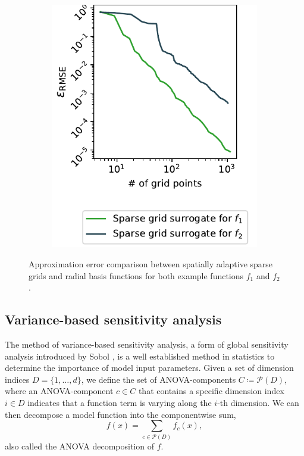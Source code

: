 \documentclass[
  a4paper,  %
  twoside,  %
  bibliography=totoc,
  headsepline,
  cleardoublepage=empty,
  parskip=half,
  draft=false
]{scrbook}
\begin{document}
\begin{mdframed}[style=style]
\begin{figure}[H]
\begin{subfigure}{.5\textwidth}
  \includegraphics[width=\linewidth]{graphics/grid_approx_f2}
  \label{fig:grid_approx_f2}
\vspace{2.5mm}
\end{subfigure}
  \delimit
\caption{
Approximation error comparison between spatially adaptive sparse grids and radial basis functions for both example functions $f_1$ and $f_2$.}
  \label{fig:dim_reduction_errors}
\end{figure}
\end{mdframed}

\subsection{Variance-based sensitivity analysis}

The method of variance-based sensitivity analysis, a form of global sensitivity analysis introduced by Sobol \cite{S01}, is a well established method in statistics to determine the importance of model input parameters.
Given a set of dimension indices $D=\{1,\dots,d\}$, we define the set of ANOVA-components $C \coloneqq \mathcal{P}(D)$, where an ANOVA-component $c \in C$ that contains a specific dimension index $i \in D$ indicates that a function term is varying along the $i$-th dimension.
We can then decompose a model function into the componentwise sum,
\begin{equation}
f(x)=\sum_{c \in \mathcal{P}(D)} f_{c}(x),
\label{anovaComp}
\end{equation}
also called the ANOVA decomposition of $f$.
\end{document}
